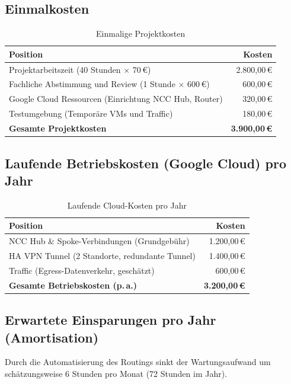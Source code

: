 \subsection*{Einmalkosten}
\begin{table}[!ht]
\centering
\begin{tabularx}{\textwidth}{|X|r|}
\hline
\textbf{Position} & \textbf{Kosten} \\ \hline
Projektarbeitszeit (40 Stunden $\times$ 70\,€) & 2.800,00\,€ \\ \hline
Fachliche Abstimmung und Review (1 Stunde $\times$ 600\,€) & 600,00\,€ \\ \hline
Google Cloud Ressourcen (Einrichtung NCC Hub, Router) & 320,00\,€ \\ \hline
Testumgebung (Temporäre VMs und Traffic) & 180,00\,€ \\ \hline
\textbf{Gesamte Projektkosten} & \textbf{3.900,00\,€} \\ \hline
\end{tabularx}
\caption{Einmalige Projektkosten}
\end{table}

\subsection*{Laufende Betriebskosten (Google Cloud) pro Jahr}
\begin{table}[!ht]
\centering
\begin{tabularx}{\textwidth}{|X|r|}
\hline
\textbf{Position} & \textbf{Kosten} \\ \hline
NCC Hub \& Spoke-Verbindungen (Grundgebühr) & 1.200,00\,€ \\ \hline
HA VPN Tunnel (2 Standorte, redundante Tunnel) & 1.400,00\,€ \\ \hline
Traffic (Egress-Datenverkehr, geschätzt) & 600,00\,€ \\ \hline
\textbf{Gesamte Betriebskosten (p.\,a.)} & \textbf{3.200,00\,€} \\ \hline
\end{tabularx}
\caption{Laufende Cloud-Kosten pro Jahr}
\end{table}

\subsection*{Erwartete Einsparungen pro Jahr (Amortisation)}
Durch die Automatisierung des Routings sinkt der Wartungsaufwand um schätzungsweise 6 Stunden pro Monat (72 Stunden im Jahr).

